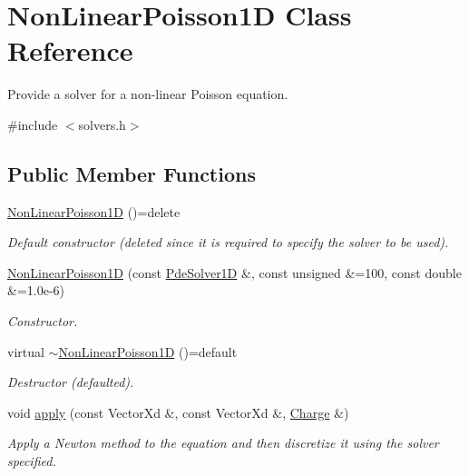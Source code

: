 \hypertarget{classNonLinearPoisson1D}{\section{Non\-Linear\-Poisson1\-D Class Reference}
\label{classNonLinearPoisson1D}
}


Provide a solver for a non-\/linear Poisson equation.  




{\ttfamily \#include $<$solvers.\-h$>$}

\subsection*{Public Member Functions}
\begin{DoxyCompactItemize}
\item 
\hypertarget{classNonLinearPoisson1D_ad4d805d47a62331707176ad2693499f3}{\hyperlink{classNonLinearPoisson1D_ad4d805d47a62331707176ad2693499f3}{Non\-Linear\-Poisson1\-D} ()=delete}\label{classNonLinearPoisson1D_ad4d805d47a62331707176ad2693499f3}

\begin{DoxyCompactList}\small\item\em Default constructor (deleted since it is required to specify the solver to be used). \end{DoxyCompactList}\item 
\hyperlink{classNonLinearPoisson1D_af102dded9f007403d0e795413c59d7d3}{Non\-Linear\-Poisson1\-D} (const \hyperlink{classPdeSolver1D}{Pde\-Solver1\-D} \&, const unsigned \&=100, const double \&=1.\-0e-\/6)
\begin{DoxyCompactList}\small\item\em Constructor. \end{DoxyCompactList}\item 
\hypertarget{classNonLinearPoisson1D_a1452123e4787361491d2f54c46794df9}{virtual \hyperlink{classNonLinearPoisson1D_a1452123e4787361491d2f54c46794df9}{$\sim$\-Non\-Linear\-Poisson1\-D} ()=default}\label{classNonLinearPoisson1D_a1452123e4787361491d2f54c46794df9}

\begin{DoxyCompactList}\small\item\em Destructor (defaulted). \end{DoxyCompactList}\item 
void \hyperlink{classNonLinearPoisson1D_abd3b11ca576a30baefa0c73c2beb31cf}{apply} (const Vector\-Xd \&, const Vector\-Xd \&, \hyperlink{classCharge}{Charge} \&)
\begin{DoxyCompactList}\small\item\em Apply a Newton method to the equation and then discretize it using the solver specified. \end{DoxyCompactList}\end{DoxyCompactItemize}
